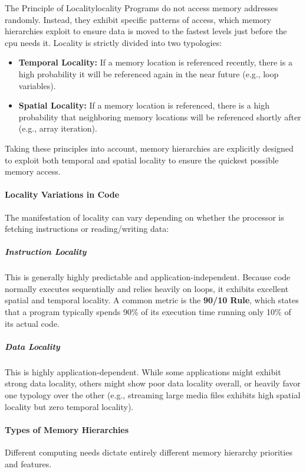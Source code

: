 \begin{concept}{The Principle of Locality}{locality}
    Programs do not access memory addresses randomly. Instead, they exhibit specific patterns of access, which memory hierarchies exploit to ensure data is moved to the fastest levels just before the \gls{cpu} needs it. Locality is strictly divided into two typologies:
    \begin{itemize}
        \item \textbf{Temporal Locality:} If a memory location is referenced recently, there is a high probability it will be referenced again in the near future (e.g., loop variables).
        \item \textbf{Spatial Locality:} If a memory location is referenced, there is a high probability that neighboring memory locations will be referenced shortly after (e.g., array iteration).
    \end{itemize}
\end{concept}

\noindent Taking these principles into account, memory hierarchies are explicitly designed to exploit both temporal and spatial locality to ensure the quickest possible memory access.

\paragraph{Locality Variations in Code}
The manifestation of locality can vary depending on whether the processor is fetching instructions or reading/writing data:

\subparagraph{Instruction Locality} 
This is generally highly predictable and application-independent. Because code normally executes sequentially and relies heavily on loops, it exhibits excellent spatial and temporal locality. A common metric is the \textbf{90/10 Rule}, which states that a program typically spends 90\% of its execution time running only 10\% of its actual code.

\subparagraph{Data Locality} 
This is highly application-dependent. While some applications might exhibit strong data locality, others might show poor data locality overall, or heavily favor one typology over the other (e.g., streaming large media files exhibits high spatial locality but zero temporal locality).

\paragraph{Types of Memory Hierarchies} 
Different computing needs dictate entirely different memory hierarchy priorities and features.

